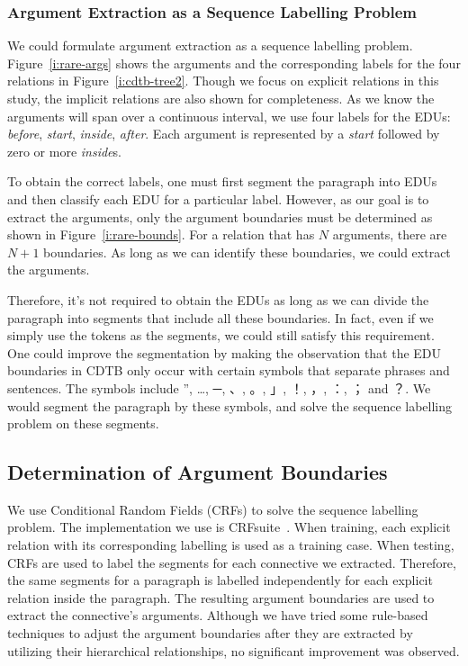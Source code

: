 \subsubsection{Argument Extraction as a Sequence Labelling Problem}

We could formulate argument extraction as a sequence labelling problem.
Figure~\ref{i:rare-args} shows the arguments and the corresponding labels
for the four relations in Figure~\ref{i:cdtb-tree2}. Though we
focus on explicit relations in this study, the implicit relations are also shown
for completeness.
As we know the arguments will span over a continuous interval,
we use four labels for the EDUs: \textit{before}, \textit{start},
\textit{inside}, \textit{after}. Each argument is represented by
a \textit{start} followed by zero or more \textit{inside}s.



To obtain the correct labels, one must first segment the paragraph
into EDUs and then classify each EDU for a particular label.
However, as our goal is to extract the arguments, only the
argument boundaries must be determined as shown in
Figure~\ref{i:rare-bounds}. For a relation that has $N$ arguments,
there are $N+1$ boundaries. As long as we can identify these boundaries,
we could extract the arguments.




Therefore, it's not required to obtain the EDUs as long as
we can divide the paragraph into segments that include all these boundaries.
In fact, even if we simply use the tokens as the segments, we could still satisfy
this requirement. One could improve the segmentation by making the observation
that the EDU boundaries in CDTB only occur with certain symbols that separate
phrases and sentences. The symbols include ”, …, ─, 、, 。, 」, ！, ，, ：, ； and ？.
We would segment the paragraph by these symbols, and solve the sequence labelling
problem on these segments.

\subsection{Determination of Argument Boundaries}

We use Conditional Random Fields (CRFs) to solve the sequence labelling problem.
The implementation we use is CRFsuite~\citep{CRFsuite}. When training, each explicit
relation with its corresponding labelling is used as a training case. When testing,
CRFs are used to label the segments for each connective we extracted. Therefore,
the same segments for a paragraph is labelled independently for each explicit relation
inside the paragraph. The resulting argument boundaries are used to extract the connective's
arguments. Although we have tried some rule-based techniques to adjust the argument boundaries
after they are extracted by utilizing their hierarchical relationships,
no significant improvement was observed.


